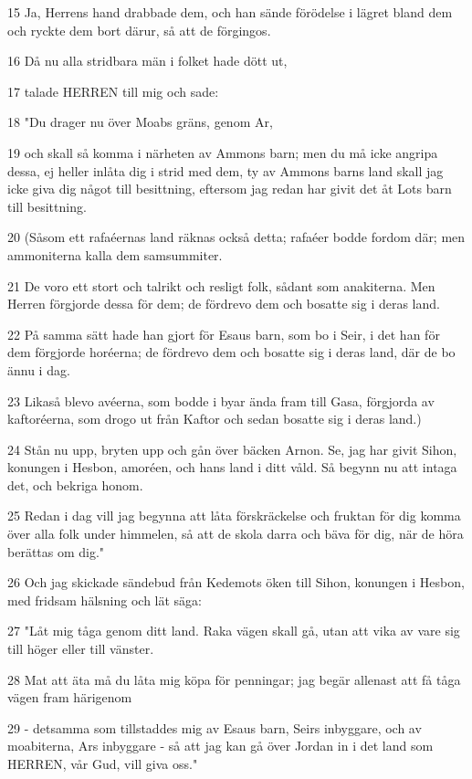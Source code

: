 \par 15 Ja, Herrens hand drabbade dem, och han sände förödelse i lägret bland dem och ryckte dem bort därur, så att de förgingos.
\par 16 Då nu alla stridbara män i folket hade dött ut,
\par 17 talade HERREN till mig och sade:
\par 18 "Du drager nu över Moabs gräns, genom Ar,
\par 19 och skall så komma i närheten av Ammons barn; men du må icke angripa dessa, ej heller inlåta dig i strid med dem, ty av Ammons barns land skall jag icke giva dig något till besittning, eftersom jag redan har givit det åt Lots barn till besittning.
\par 20 (Såsom ett rafaéernas land räknas också detta; rafaéer bodde fordom där; men ammoniterna kalla dem samsummiter.
\par 21 De voro ett stort och talrikt och resligt folk, sådant som anakiterna. Men Herren förgjorde dessa för dem; de fördrevo dem och bosatte sig i deras land.
\par 22 På samma sätt hade han gjort för Esaus barn, som bo i Seir, i det han för dem förgjorde horéerna; de fördrevo dem och bosatte sig i deras land, där de bo ännu i dag.
\par 23 Likaså blevo avéerna, som bodde i byar ända fram till Gasa, förgjorda av kaftoréerna, som drogo ut från Kaftor och sedan bosatte sig i deras land.)
\par 24 Stån nu upp, bryten upp och gån över bäcken Arnon. Se, jag har givit Sihon, konungen i Hesbon, amoréen, och hans land i ditt våld. Så begynn nu att intaga det, och bekriga honom.
\par 25 Redan i dag vill jag begynna att låta förskräckelse och fruktan för dig komma över alla folk under himmelen, så att de skola darra och bäva för dig, när de höra berättas om dig."
\par 26 Och jag skickade sändebud från Kedemots öken till Sihon, konungen i Hesbon, med fridsam hälsning och lät säga:
\par 27 "Låt mig tåga genom ditt land. Raka vägen skall gå, utan att vika av vare sig till höger eller till vänster.
\par 28 Mat att äta må du låta mig köpa för penningar; jag begär allenast att få tåga vägen fram härigenom
\par 29 - detsamma som tillstaddes mig av Esaus barn, Seirs inbyggare, och av moabiterna, Ars inbyggare - så att jag kan gå över Jordan in i det land som HERREN, vår Gud, vill giva oss."
